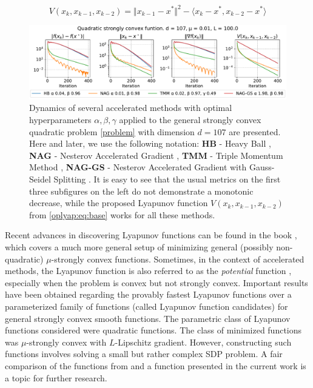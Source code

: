 \documentclass[a4paper,11pt]{article}
\begin{document}
\begin{equation}
    \label{oplyap:eq:base}
    V(x_k, x_{k-1}, x_{k-2}) = \Vert x_{k-1} - x^*\Vert ^2 - \langle x_k - x^*, x_{k-2} - x^* \rangle
\end{equation}

\begin{figure}[h!]
    \centering
    \includegraphics[width=\linewidth]{the_figure.pdf}
    \caption{Dynamics of several accelerated methods with optimal hyperparameters $\alpha, \beta, \gamma$ applied to the general strongly convex quadratic problem \eqref{problem} with dimension $d = 107$ are presented. Here and later, we use the following notation: \textbf{HB} - Heavy Ball \cite{polyak1964some}, \textbf{NAG} - Nesterov Accelerated Gradient \cite{nesterov1983method}, \textbf{TMM} - Triple Momentum Method \cite{van2017fastest}, \textbf{NAG-GS} - Nesterov Accelerated Gradient with Gauss-Seidel Splitting \cite{leplat2022nag}. It is easy to see that the usual metrics on the first three subfigures on the left do not demonstrate a monotonic decrease, while the proposed Lyapunov function $V(x_k, x_{k-1}, x_{k-2})$ from \eqref{oplyap:eq:base} works for all these methods.}
    \label{oplyap:fig:hb_non_monotonic}
\end{figure}

Recent advances in discovering Lyapunov functions can be found in the book \cite{vorontsova2021convex}, which covers a much more general setup of minimizing general (possibly non-quadratic) $\mu$-strongly convex functions. Sometimes, in the context of accelerated methods, the Lyapunov function is also referred to as the \textit{potential} function \cite{d2021acceleration}, especially when the problem is convex but not strongly convex. Important results have been obtained regarding the provably fastest Lyapunov functions \cite{taylor2018lyapunov} over a parameterized family of functions (called Lyapunov function candidates) for general strongly convex smooth functions. The parametric class of Lyapunov functions considered were quadratic functions. The class of minimized functions was $\mu$-strongly convex with $L$-Lipschitz gradient. However, constructing such functions involves solving a small but rather complex SDP problem. A fair comparison of the functions from \cite{taylor2018lyapunov} and a function presented in the current work is a topic for further research.
\end{document}
